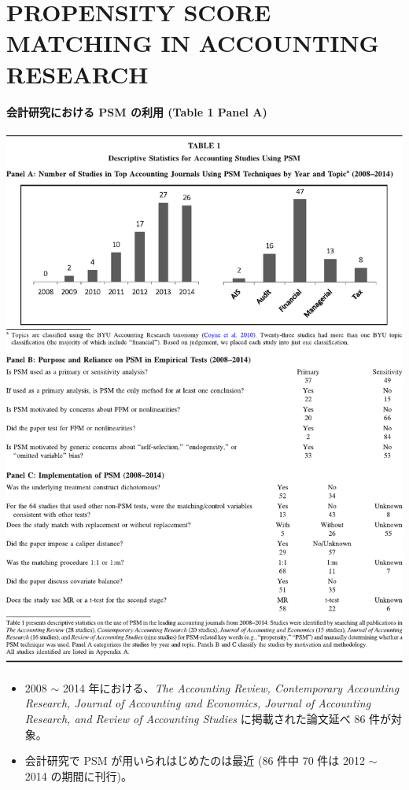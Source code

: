\section{PROPENSITY SCORE MATCHING IN ACCOUNTING RESEARCH}

\paragraph{会計研究における PSM の利用 (Table 1 Panel A)}

\begin{table}
 \centering
 \includegraphics[width=16cm]{../table/tbl01.pdf}
\end{table}

\begin{itemize}
 \item 2008 $\sim$ 2014 年における、\textit{The Accounting Review,
       Contemporary Accounting Research, Journal of Accounting and
       Economics, Journal of Accounting Research, and Review of
       Accounting Studies} に掲載された論文延べ 86 件が対象。
 \item 会計研究で PSM が用いられはじめたのは最近 (86 件中 70 件は 2012
       $\sim$ 2014 の期間に刊行)。
\end{itemize}

